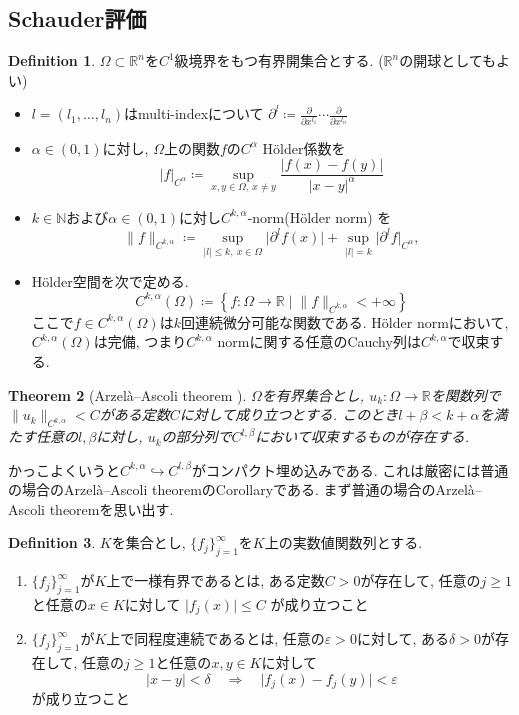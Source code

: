 \documentclass[dvipdfmx,a4paper,11pt]{article} %
\newtheorem{thm}{Theorem}[section]
\theoremstyle{definition}
\newtheorem{defn}[thm]{Definition}
\theoremstyle{remark}
\numberwithin{equation}{section}
\newcommand{\R}{\mathbb{R}}
\begin{document}
\subsection{Schauder評価}


\begin{defn}
\label{defn-Holder}
 $\Omega\subset\mathbb{R}^n$を$C^1$級境界をもつ有界開集合とする. ($\mathbb{R}^n$の開球としてもよい)
 \begin{itemize}
 \item  $l=(l_1,\ldots,l_n)$はmulti-indexについて
\(
\partial^l\coloneqq \frac{\partial}{\partial x^{l_1}}\cdots\frac{\partial}{\partial x^{l_n}}
\)
 \item $\alpha\in(0,1)$に対し, $\Omega$上の関数$f$の$C^\alpha$ H\"older係数を
\[
\lvert f\rvert_{C^\alpha}\coloneqq \sup_{x,y\in\Omega,\ x\ne y}\frac{\lvert f(x)-f(y)\rvert}{\lvert x-y\rvert^\alpha}
\]
\item $k\in\mathbb{N}$および$\alpha\in(0,1)$に対し$C^{k,\alpha}$-norm(H\"older norm) を
\[
\lVert f\rVert_{C^{k,\alpha}}
\coloneqq \sup_{\lvert l\rvert\leq k,\ x\in\Omega}\lvert\partial^l f(x)\rvert
+\sup_{\lvert l\rvert=k}\lvert\partial^l f\rvert_{C^\alpha},
\]
\item H\"older空間を次で定める. 
\[
C^{k,\alpha}(\Omega)
\coloneqq \left\{
f  \colon \Omega \to \R \mid  \lVert f\rVert_{C^{k,\alpha}} < + \infty\right\}
\]
ここで$f \in C^{k,\alpha}(\Omega)$は$k$回連続微分可能な関数である. H\"older normにおいて, $C^{k,\alpha}(\Omega)$は完備, つまり$C^{k,\alpha}$ normに関する任意のCauchy列は$C^{k,\alpha}$で収束する. 
 \end{itemize}
\end{defn}

\begin{thm}[Arzel\`a--Ascoli theorem {\cite[Theorem 2.6]{Sze14}}]
\label{thm-Arzela-Ascoli}
$\Omega$を有界集合とし, $u_k\colon \Omega\to\mathbb{R}$を関数列で$\lVert u_k\rVert_{C^{k,\alpha}}<C$がある定数$C$に対して成り立つとする.
このとき$l+\beta<k+\alpha$を満たす任意の$l,\beta$に対し, $u_k$の部分列で$C^{l,\beta}$において収束するものが存在する.
\end{thm}
かっこよくいうと$C^{k, \alpha} \hookrightarrow C^{l, \beta}$がコンパクト埋め込みである. 
これは厳密には普通の場合のArzel\`a--Ascoli theoremのCorollaryである. まず普通の場合のArzel\`a--Ascoli theoremを思い出す. 
\begin{defn}
$K$を集合とし, $\{f_j\}_{j=1}^{\infty}$を$K$上の実数値関数列とする.
\begin{enumerate}
\item $\{f_j\}_{j=1}^{\infty}$が$K$上で一様有界であるとは, ある定数$C>0$が存在して, 任意の$j\geq 1$と任意の$x\in K$に対して
\(
  \lvert f_j(x)\rvert\leq C
\)
が成り立つこと
\item $\{f_j\}_{j=1}^{\infty}$が$K$上で同程度連続であるとは, 任意の$\varepsilon>0$に対して, ある$\delta>0$が存在して, 任意の$j\geq 1$と任意の$x,y\in K$に対して
\[
  \lvert x-y\rvert<\delta
  \quad\Longrightarrow\quad
  \lvert f_j(x)-f_j(y)\rvert<\varepsilon
\]
が成り立つこと
\end{enumerate}
\end{defn}
\end{document}
